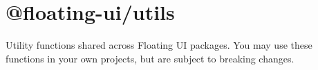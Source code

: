 \chapter{@floating-\/ui/utils}
\hypertarget{md__2home_2solype_2delivery_2current__days_2trello_2front_2node__modules_2_0dfloating-ui_2utils_2README}{}\label{md__2home_2solype_2delivery_2current__days_2trello_2front_2node__modules_2_0dfloating-ui_2utils_2README}
\label{md__2home_2solype_2delivery_2current__days_2trello_2front_2node__modules_2_0dfloating-ui_2utils_2README_autotoc_md7881}%
%
 Utility functions shared across Floating UI packages. You may use these functions in your own projects, but are subject to breaking changes. 